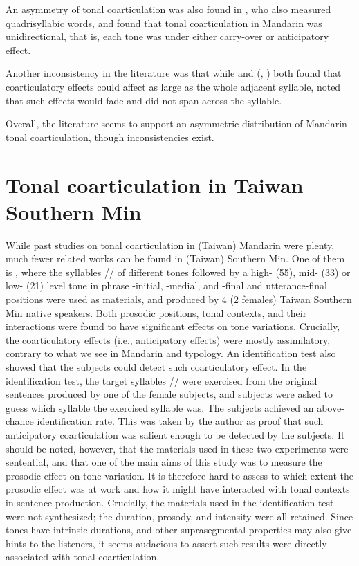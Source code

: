 \documentclass[12pt]{report}
\newcommand{\tip}{\textipa}
\begin{document}
\begin{CJK}{UTF8}{bsmi}
An asymmetry of tonal coarticulation was also found in \cite{LinYan1991}, who also measured quadrisyllabic words, and found that tonal coarticulation in Mandarin was unidirectional, that is, each tone was under either carry-over or anticipatory effect.

Another inconsistency in the literature was that while \cite{Shen1990} and \citeauthor{Xu1994a} (\citeyear{Xu1994a}, \citeyear{Xu1997}) both found that coarticulatory effects could affect as large as the whole adjacent syllable, \cite{LinYan1991} noted that such effects would fade and did not span across the syllable.

Overall, the literature seems to support an asymmetric distribution of Mandarin tonal coarticulation, though inconsistencies exist.

\section{Tonal coarticulation in Taiwan Southern Min}
While past studies on tonal coarticulation in (Taiwan) Mandarin were plenty, much fewer related works can be found in (Taiwan) Southern Min. One of them is \cite{Peng1997}, where the syllables /\tip{kaw}/ of different tones followed by a high- (55), mid- (33) or low- (21) level tone in phrase -initial, -medial, and -final and utterance-final positions were used as materials, and produced by 4 (2 females) Taiwan Southern Min native speakers. Both prosodic positions, tonal contexts, and their interactions were found to have significant effects on tone variations. Crucially, the coarticulatory effects (i.e., anticipatory effects) were mostly assimilatory, contrary to what we see in Mandarin and typology. An identification test also showed that the subjects could detect such coarticulatory effect. In the identification test, the target syllables /\tip{kau}/ were exercised from the original sentences produced by one of the female subjects, and subjects were asked to guess which syllable the exercised syllable was. The subjects achieved an above-chance identification rate. This was taken by the author as proof that such anticipatory coarticulation was salient enough to be detected by the subjects. It should be noted, however, that  the materials used in these two experiments were sentential, and that one of the main aims of this study was to measure the prosodic effect on tone variation. It is therefore hard to assess to which extent the prosodic effect was at work and how it might have interacted with tonal contexts in sentence production. Crucially, the materials used in the identification test were not synthesized; the duration, prosody, and intensity were all retained. Since tones have intrinsic durations, and other suprasegmental properties may also give hints to the listeners, it seems audacious to assert such results were directly associated with tonal coarticulation.


\end{CJK}
\end{document}

